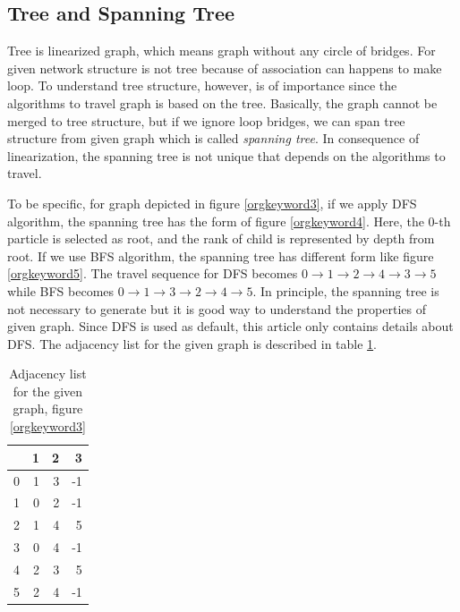 \documentclass[10pt, a4paper]{article}
\begin{document}
\begin{appendices}
\subsection{Tree and Spanning Tree}
\label{sec:orgheadline15}
Tree is linearized graph, which means graph without any circle of bridges. For given network structure is not tree because of association can happens to make loop. To understand tree structure, however, is of importance since the algorithms to travel graph is based on the tree. Basically, the graph cannot be merged to tree structure, but if we ignore loop bridges, we can span tree structure from given graph which is called \emph{spanning tree}. In consequence of linearization, the spanning tree is not unique that depends on the algorithms to travel. 

To be specific, for graph depicted in figure \ref{orgkeyword3}, if we apply DFS algorithm, the spanning tree has the form of figure \ref{orgkeyword4}. Here, the 0-th particle is selected as root, and the rank of child is represented by depth from root. If we use BFS algorithm, the spanning tree has different form like figure \ref{orgkeyword5}. The travel sequence for DFS becomes \(0\to 1\to 2\to 4\to 3\to 5\) while BFS becomes \(0\to 1\to 3\to 2\to 4\to 5\). In principle, the spanning tree is not necessary to generate but it is good way to understand the properties of given graph. Since DFS is used as default, this article only contains details about DFS. The adjacency list for the given graph is described in table \ref{tab:orgtable5}.

\begin{table}[htb]
\caption{\label{tab:orgtable5}
Adjacency list for the given graph, figure \ref{orgkeyword3}}
\centering
\begin{tabular}{rrrr}
 & 1 & 2 & 3\\
\hline
0 & 1 & 3 & -1\\
1 & 0 & 2 & -1\\
2 & 1 & 4 & 5\\
3 & 0 & 4 & -1\\
4 & 2 & 3 & 5\\
5 & 2 & 4 & -1\\
\hline
\end{tabular}
\end{table}


\end{appendices}
\end{document}
